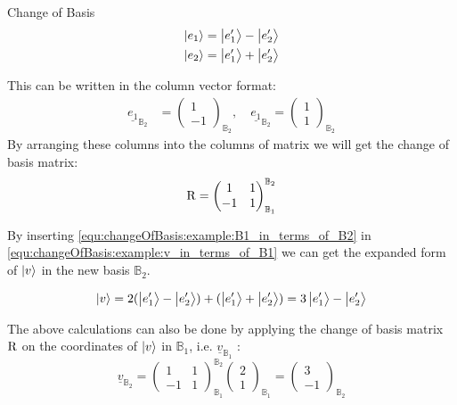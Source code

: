 \begin{example}{Change of Basis}
	\begin{equation}
		\begin{split}
			\ket{e_1} &= \ket{e'_1} - \ket{e'_2} \\
			\ket{e_2} &= \ket{e'_1} + \ket{e'_2} 
		\end{split}
		\label{equ:changeOfBasis:example:B1_in_terms_of_B2}
	\end{equation}

	This can be written in the column vector format:
	\begin{align*}
		\underline{e_1}_{\mathbb{B}_2} &= \begin{pmatrix}
			1 \\
			-1
		\end{pmatrix}_{\mathbb{B}_2} , \quad
		\underline{e_1}_{\mathbb{B}_2} = \begin{pmatrix}
			1 \\
			1
		\end{pmatrix}_{\mathbb{B}_2}
	\end{align*}
	By arranging these columns into the columns of matrix we will get the change of basis matrix:
	\begin{equation*}
		\operatorname{R} = \begin{pmatrix}
			1 & 1 \\
			-1 & 1
		\end{pmatrix}_{\mathbb{B}_1}^{\mathbb{B}_2}
	\end{equation*}

	By inserting \ref{equ:changeOfBasis:example:B1_in_terms_of_B2} in \ref{equ:changeOfBasis:example:v_in_terms_of_B1} we can get the expanded form of $ \ket{v} $ in the new basis $\mathbb{B}_2$.
	
	\begin{equation*}
		\ket{v} = 2 (\ket{e'_1} - \ket{e'_2}) + (\ket{e'_1} + \ket{e'_2} ) = 3 \ket{e'_1} -\ket{e'_2} 
	\end{equation*}

	The above calculations can also be done by applying the change of basis matrix $ \operatorname{R} $ on the coordinates of $ \ket{v} $ in $ \mathbb{B}_1 $, i.e. $ \underline{v}_{\mathbb{B}_1} $ :
	\begin{equation*}
		\underline{v}_{\mathbb{B}_2} = \begin{pmatrix}
			1 & 1 \\
			-1 & 1
		\end{pmatrix}_{\mathbb{B}_1}^{\mathbb{B}_2}
		\begin{pmatrix}
			2 \\
			1
		\end{pmatrix}_{\mathbb{B}_1} = 
	\begin{pmatrix}
		3 \\
		-1
	\end{pmatrix}_{\mathbb{B}_2}
	\end{equation*}
\end{example}







